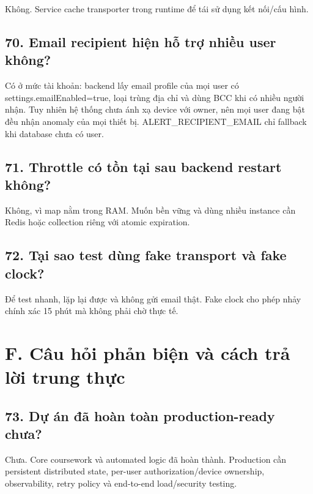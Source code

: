 \documentclass[11pt,oneside,openany]{book}
\renewcommand{\texttt}[1]{{\ttfamily\small #1}}
\begin{document}
Không. Service cache transporter trong runtime để tái sử dụng kết
nối/cấu hình.

\subsection{70. Email recipient hiện hỗ trợ nhiều user
không?}\label{70-email-recipient-hiux1ec7n-hux1ed7-trux1ee3-nhiux1ec1u-user-khuxf4ng}

Có ở mức tài khoản: backend lấy email profile của mọi user có
\texttt{settings.emailEnabled=true}, loại trùng địa chỉ và dùng BCC khi
có nhiều người nhận. Tuy nhiên hệ thống chưa ánh xạ device với owner,
nên mọi user đang bật đều nhận anomaly của mọi thiết bị.
\texttt{ALERT\_RECIPIENT\_EMAIL} chỉ fallback khi database chưa có user.

\subsection{71. Throttle có tồn tại sau backend restart
không?}\label{71-throttle-cuxf3-tux1ed3n-tux1ea1i-sau-backend-restart-khuxf4ng}

Không, vì map nằm trong RAM. Muốn bền vững và dùng nhiều instance cần
Redis hoặc collection riêng với atomic expiration.

\subsection{72. Tại sao test dùng fake transport và fake
clock?}\label{72-tux1ea1i-sao-test-duxf9ng-fake-transport-vuxe0-fake-clock}

Để test nhanh, lặp lại được và không gửi email thật. Fake clock cho phép
nhảy chính xác 15 phút mà không phải chờ thực tế.

\section{F. Câu hỏi phản biện và cách trả lời trung
thực}\label{f-cuxe2u-hux1ecfi-phux1ea3n-biux1ec7n-vuxe0-cuxe1ch-trux1ea3-lux1eddi-trung-thux1ef1c}

\subsection{73. Dự án đã hoàn toàn production-ready
chưa?}\label{73-dux1ef1-uxe1n-ux111uxe3-houxe0n-touxe0n-production-ready-chux1b0a}

Chưa. Core coursework và automated logic đã hoàn thành. Production cần
persistent distributed state, per-user authorization/device ownership,
observability, retry policy và end-to-end load/security testing.
\end{document}
